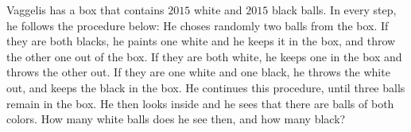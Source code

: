 Vaggelis has a box that contains $2015$ white and $2015$ black balls. In every step, he follows the procedure below:
He choses randomly two balls from the box. If they are both blacks, he paints one white and he keeps it in the box, and throw the other one out of the box. If they are both white, he keeps one in the box and throws the other out. If they are one white and one black, he throws the white out, and keeps the black in the box.
He continues this procedure, until three balls remain in the box. He then looks inside and he sees that there are balls of both colors. How many white balls does he see then, and how many black?